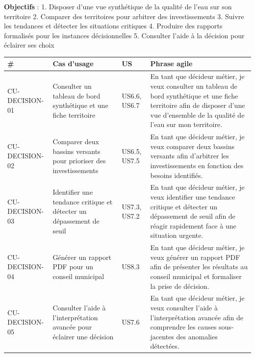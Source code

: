 \documentclass[
  paper=a4,
  oneside  ,captions=tableheading
]{scrartcl}
\begin{document}
\textbf{Objectifs} : 1. Disposer d'une vue synthétique de la qualité de
l'eau sur son territoire 2. Comparer des territoires pour arbitrer des
investissements 3. Suivre les tendances et détecter les situations
critiques 4. Produire des rapports formalisés pour les instances
décisionnelles 5. Consulter l'aide à la décision pour éclairer ses choix

{\def\LTcaptype{none} %
\begin{longtable}[]{@{}
  >{\raggedright\arraybackslash}p{}
  >{\raggedright\arraybackslash}p{}
  >{\raggedright\arraybackslash}p{}
  >{\raggedright\arraybackslash}p{}@{}}
\toprule\noalign{}
\begin{minipage}[b]{\linewidth}\raggedright
\#
\end{minipage} & \begin{minipage}[b]{\linewidth}\raggedright
Cas d'usage
\end{minipage} & \begin{minipage}[b]{\linewidth}\raggedright
US
\end{minipage} & \begin{minipage}[b]{\linewidth}\raggedright
Phrase agile
\end{minipage} \\
\midrule\noalign{}
\endhead
\bottomrule\noalign{}
\endlastfoot
CU-DECISION-01 & Consulter un tableau de bord synthétique et une fiche
territoire & US6.6, US6.7 & En tant que décideur métier, je veux
consulter un tableau de bord synthétique et une fiche territoire afin de
disposer d'une vue d'ensemble de la qualité de l'eau sur mon
territoire. \\
CU-DECISION-02 & Comparer deux bassins versants pour prioriser des
investissements & US6.5, US7.5 & En tant que décideur métier, je veux
comparer deux bassins versants afin d'arbitrer les investissements en
fonction des besoins identifiés. \\
CU-DECISION-03 & Identifier une tendance critique et détecter un
dépassement de seuil & US7.3, US7.2 & En tant que décideur métier, je
veux identifier une tendance critique et détecter un dépassement de
seuil afin de réagir rapidement face à une situation urgente. \\
CU-DECISION-04 & Générer un rapport PDF pour un conseil municipal &
US8.3 & En tant que décideur métier, je veux générer un rapport PDF afin
de présenter les résultats au conseil municipal et formaliser la prise
de décision. \\
CU-DECISION-05 & Consulter l'aide à l'interprétation avancée pour
éclairer une décision & US7.6 & En tant que décideur métier, je veux
consulter l'aide à l'interprétation avancée afin de comprendre les
causes sous-jacentes des anomalies détectées. \\
\end{longtable}
}
\end{document}
